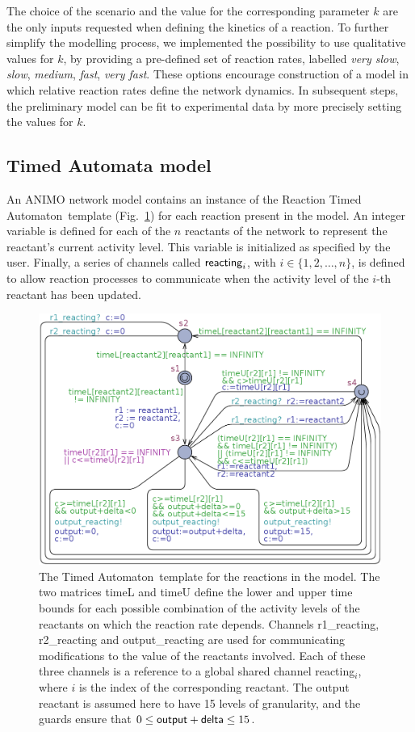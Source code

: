 \documentclass[journal, 10pt]{IEEEtran}
\def\ta{Timed Automaton}
\begin{document}
The choice of the scenario and the value for the corresponding parameter $k$ are the only inputs requested when
defining the kinetics of a reaction. To further simplify the modelling process,
we implemented the possibility to use qualitative values for $k$, by providing a pre-defined set of 
reaction rates, labelled \emph{very slow}, \emph{slow}, \emph{medium}, \emph{fast}, \emph{very fast}. These options encourage
construction of a model in which relative reaction rates define the network dynamics. In subsequent steps, the preliminary model can be fit 
to experimental data by more precisely setting the values for $k$.

\subsection{Timed Automata model}\label{subsec:TA-templates}
An ANIMO network model contains an instance of the Reaction \ta\ template (Fig.~\ref{fig:reaction})
for each reaction present in the model. An integer variable is defined
for each of the $n$ reactants of the network to represent the reactant's current activity level. This variable is initialized as
specified by the user.
Finally, a series of channels called
$\mbox{\sf reacting}_i$, with $i \in \{1, 2, \dots, n\}$, is defined to allow reaction processes to communicate 
when the activity level of the $i$-th reactant has been updated.

\begin{figure}[htb]%
\centering%
\includegraphics[width=.48\textwidth]{model_ta3}%
\caption{The \ta\ template for the reactions in the model. The two matrices {\sf timeL} and {\sf timeU} define
the lower and upper time bounds for each possible combination of the activity levels of the
reactants on which the reaction rate depends. Channels {\sf r1\_{}reacting}, {\sf r2\_{}reacting} and
{\sf output\_{}reacting} are used for communicating modifications to the value of the reactants involved.
Each of these three channels is a reference to a global shared channel {\sf reacting$_i$},
where $i$ is the index of the corresponding reactant. The output reactant is assumed
here to have 15 levels of granularity, and the guards ensure that $0 \leq \mbox{\sf output} + \mbox{\sf delta}
\leq 15$.\label{fig:reaction}}
\end{figure}
\end{document}
